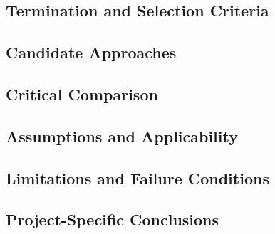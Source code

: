
\subsection{Termination and Selection Criteria}
\label{sec:res-opt-spec-termination-selection-criteria}


\subsection{Candidate Approaches}
\label{sec:res-opt-spec-candidate-approaches}


\subsection{Critical Comparison}
\label{sec:res-opt-spec-critical-comparison}


\subsection{Assumptions and Applicability}
\label{sec:res-opt-spec-assumptions}


\subsection{Limitations and Failure Conditions}
\label{sec:res-opt-spec-limitations}


\subsection{Project-Specific Conclusions}
\label{sec:res-opt-spec-conclusions}


